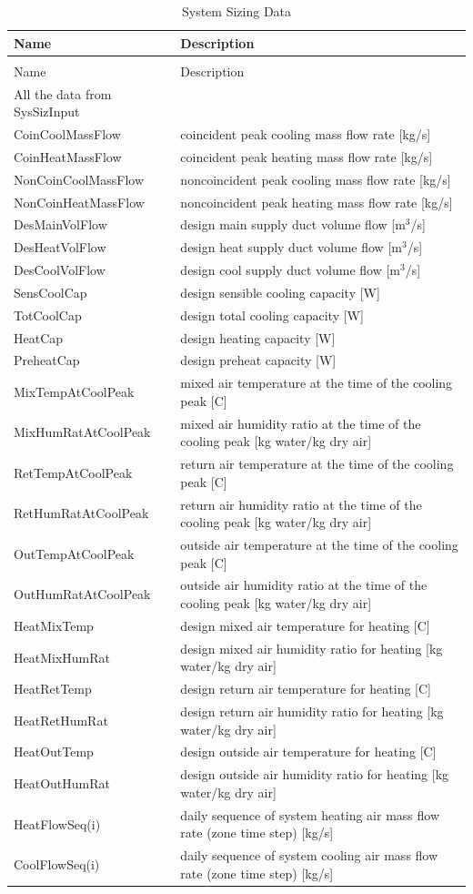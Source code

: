 \begin{longtable}[c]{p{2.0in}p{4.0in}}
\caption{System Sizing Data \label{table:system-sizing-data}} \tabularnewline
\toprule
Name & Description \tabularnewline
\midrule
\endfirsthead

\caption[]{System Sizing Data} \tabularnewline
\toprule
Name & Description \tabularnewline
\midrule
\endhead

All the data from SysSizInput &  \tabularnewline
CoinCoolMassFlow & coincident peak cooling mass flow rate [kg/s] \tabularnewline
CoinHeatMassFlow & coincident peak heating mass flow rate [kg/s] \tabularnewline
NonCoinCoolMassFlow & noncoincident peak cooling mass flow rate [kg/s] \tabularnewline
NonCoinHeatMassFlow & noncoincident peak heating mass flow rate [kg/s] \tabularnewline
DesMainVolFlow & design main supply duct volume flow [m\(^{3}\)/s] \tabularnewline
DesHeatVolFlow & design heat supply duct volume flow [m\(^{3}\)/s] \tabularnewline
DesCoolVolFlow & design cool supply duct volume flow [m\(^{3}\)/s] \tabularnewline
SensCoolCap & design sensible cooling capacity [W] \tabularnewline
TotCoolCap & design total cooling capacity [W] \tabularnewline
HeatCap & design heating capacity [W] \tabularnewline
PreheatCap & design preheat capacity [W] \tabularnewline
MixTempAtCoolPeak & mixed air temperature at the time of the cooling peak [C] \tabularnewline
MixHumRatAtCoolPeak & mixed air humidity ratio at the time of the cooling peak [kg water/kg dry air] \tabularnewline
RetTempAtCoolPeak & return air temperature at the time of the cooling peak [C] \tabularnewline
RetHumRatAtCoolPeak & return air humidity ratio at the time of the cooling peak [kg water/kg dry air] \tabularnewline
OutTempAtCoolPeak & outside air temperature at the time of the cooling peak [C] \tabularnewline
OutHumRatAtCoolPeak & outside air humidity ratio at the time of the cooling peak [kg water/kg dry air] \tabularnewline
HeatMixTemp & design mixed air temperature for heating [C] \tabularnewline
HeatMixHumRat & design mixed air humidity ratio for heating [kg water/kg dry air] \tabularnewline
HeatRetTemp & design return air temperature for heating [C] \tabularnewline
HeatRetHumRat & design return air humidity ratio for heating [kg water/kg dry air] \tabularnewline
HeatOutTemp & design outside air temperature for heating [C] \tabularnewline
HeatOutHumRat & design outside air humidity ratio for heating [kg water/kg dry air] \tabularnewline
HeatFlowSeq(i) & daily sequence of system heating air mass flow rate (zone time step) [kg/s] \tabularnewline
CoolFlowSeq(i) & daily sequence of system cooling air mass flow rate (zone time step) [kg/s] \tabularnewline

\end{longtable}
